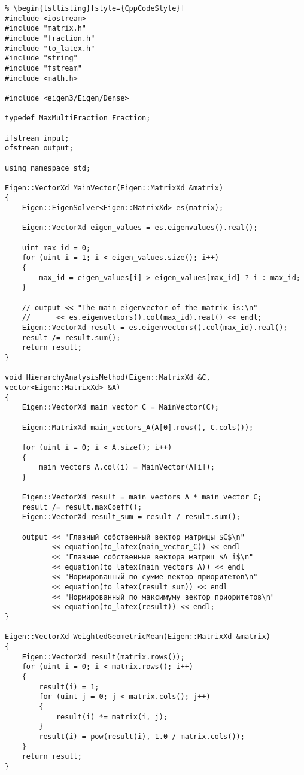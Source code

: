 \begin{lstlisting}
% \begin{lstlisting}[style={CppCodeStyle}]
#include <iostream>
#include "matrix.h"
#include "fraction.h"
#include "to_latex.h"
#include "string"
#include "fstream"
#include <math.h>

#include <eigen3/Eigen/Dense>

typedef MaxMultiFraction Fraction;

ifstream input;
ofstream output;

using namespace std;

Eigen::VectorXd MainVector(Eigen::MatrixXd &matrix)
{
    Eigen::EigenSolver<Eigen::MatrixXd> es(matrix);

    Eigen::VectorXd eigen_values = es.eigenvalues().real();

    uint max_id = 0;
    for (uint i = 1; i < eigen_values.size(); i++)
    {
        max_id = eigen_values[i] > eigen_values[max_id] ? i : max_id;
    }

    // output << "The main eigenvector of the matrix is:\n"
    //      << es.eigenvectors().col(max_id).real() << endl;
    Eigen::VectorXd result = es.eigenvectors().col(max_id).real();
    result /= result.sum();
    return result;
}

void HierarchyAnalysisMethod(Eigen::MatrixXd &C, vector<Eigen::MatrixXd> &A)
{
    Eigen::VectorXd main_vector_C = MainVector(C);

    Eigen::MatrixXd main_vectors_A(A[0].rows(), C.cols());

    for (uint i = 0; i < A.size(); i++)
    {
        main_vectors_A.col(i) = MainVector(A[i]);
    }

    Eigen::VectorXd result = main_vectors_A * main_vector_C;
    result /= result.maxCoeff();
    Eigen::VectorXd result_sum = result / result.sum();

    output << "Главный собственный вектор матрицы $C$\n"
           << equation(to_latex(main_vector_C)) << endl
           << "Главные собственные вектора матриц $A_i$\n"
           << equation(to_latex(main_vectors_A)) << endl
           << "Нормированный по сумме вектор приоритетов\n"
           << equation(to_latex(result_sum)) << endl
           << "Нормированный по максимуму вектор приоритетов\n"
           << equation(to_latex(result)) << endl;
}

Eigen::VectorXd WeightedGeometricMean(Eigen::MatrixXd &matrix)
{
    Eigen::VectorXd result(matrix.rows());
    for (uint i = 0; i < matrix.rows(); i++)
    {
        result(i) = 1;
        for (uint j = 0; j < matrix.cols(); j++)
        {
            result(i) *= matrix(i, j);
        }
        result(i) = pow(result(i), 1.0 / matrix.cols());
    }
    return result;
}


\end{lstlisting}
